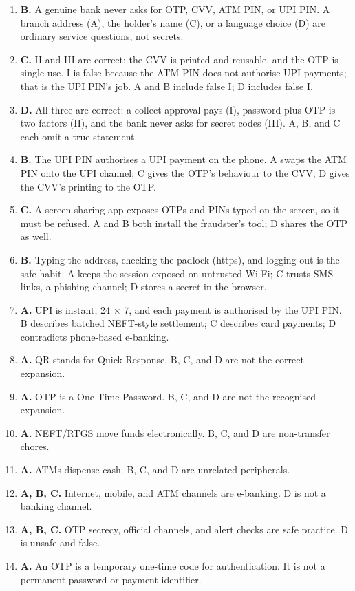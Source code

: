 \begin{enumerate}[label=\textbf{Q\arabic*.}, leftmargin=*]
\item \textbf{B.} A genuine bank never asks for OTP, CVV, ATM PIN, or UPI
  PIN. A branch address (A), the holder's name (C), or a language choice
  (D) are ordinary service questions, not secrets.
\item \textbf{C.} II and III are correct: the CVV is printed and reusable,
  and the OTP is single-use. I is false because the ATM PIN does not
  authorise UPI payments; that is the UPI PIN's job. A and B include false
  I; D includes false I.
\item \textbf{D.} All three are correct: a collect approval pays (I),
  password plus OTP is two factors (II), and the bank never asks for secret
  codes (III). A, B, and C each omit a true statement.
\item \textbf{B.} The UPI PIN authorises a UPI payment on the phone. A
  swaps the ATM PIN onto the UPI channel; C gives the OTP's behaviour to
  the CVV; D gives the CVV's printing to the OTP.
\item \textbf{C.} A screen-sharing app exposes OTPs and PINs typed on the
  screen, so it must be refused. A and B both install the fraudster's tool;
  D shares the OTP as well.
\item \textbf{B.} Typing the address, checking the padlock (https), and
  logging out is the safe habit. A keeps the session exposed on untrusted
  Wi-Fi; C trusts SMS links, a phishing channel; D stores a secret in the
  browser.
\item \textbf{A.} UPI is instant, 24 $\times$ 7, and each payment is
  authorised by the UPI PIN. B describes batched NEFT-style settlement; C
  describes card payments; D contradicts phone-based e-banking.
\item \textbf{A.} QR stands for Quick Response. B, C, and D are not the
  correct expansion.

\item \textbf{A.} OTP is a One-Time Password. B, C, and D are not the recognised expansion.
\item \textbf{A.} NEFT/RTGS move funds electronically. B, C, and D are non-transfer chores.
\item \textbf{A.} ATMs dispense cash. B, C, and D are unrelated peripherals.
\item \textbf{A, B, C.} Internet, mobile, and ATM channels are e-banking. D is not a banking channel.
\item \textbf{A, B, C.} OTP secrecy, official channels, and alert checks are safe practice. D is unsafe and false.
\item \textbf{A.} An OTP is a temporary one-time code for authentication. It is not a permanent password or payment identifier.


\end{enumerate}
